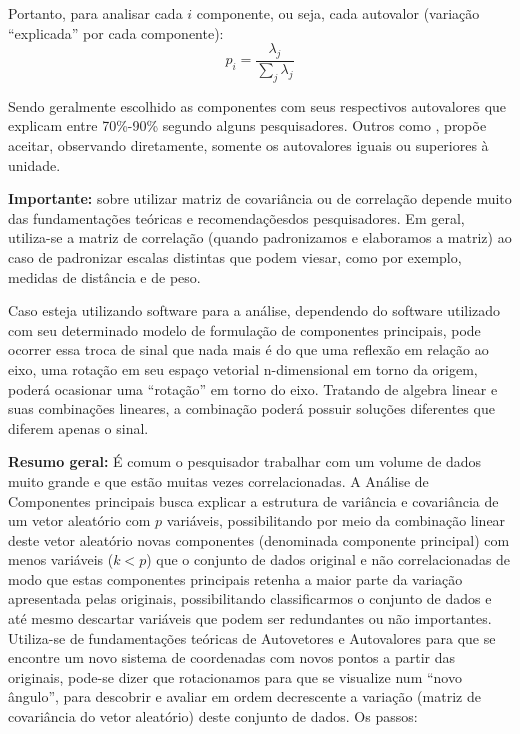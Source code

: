 \documentclass[
]{book}
\begin{document}
Portanto, para analisar cada \(i\) componente, ou seja, cada autovalor (variação ``explicada'' por cada componente):
\begin{equation}
    p_i=\frac{\lambda_j}{\displaystyle \sum_j \lambda_j} 
    \label{eq:varind}
\end{equation}

Sendo geralmente escolhido as componentes com seus respectivos autovalores que explicam entre 70\%-90\% segundo alguns pesquisadores. Outros como \citet{kaiser1960application}, propõe aceitar, observando diretamente, somente os autovalores iguais ou superiores à unidade.

\textbf{Importante:} sobre utilizar matriz de covariância ou de correlação depende muito das fundamentações teóricas e recomendaçõesdos pesquisadores. Em geral, utiliza-se a matriz de correlação (quando padronizamos e elaboramos a matriz) ao caso de padronizar escalas distintas que podem viesar, como por exemplo, medidas de distância e de peso.

Caso esteja utilizando software para a análise, dependendo do software utilizado com seu determinado modelo de formulação de componentes principais, pode ocorrer essa troca de sinal que nada mais é do que uma reflexão em relação ao eixo, uma rotação em seu espaço vetorial n-dimensional em torno da origem, poderá ocasionar uma ``rotação'' em torno do eixo. Tratando de algebra linear e suas combinações lineares, a combinação poderá possuir soluções diferentes que diferem apenas o sinal.

\textbf{Resumo geral:} É comum o pesquisador trabalhar com um volume de dados muito grande e que estão muitas vezes correlacionadas. A Análise de Componentes principais busca explicar a estrutura de variância e covariância de um vetor aleatório com \(p\) variáveis, possibilitando por meio da combinação linear deste vetor aleatório novas componentes (denominada componente principal) com menos variáveis (\(k<p\)) que o conjunto de dados original e não correlacionadas de modo que estas componentes principais retenha a maior parte da variação apresentada pelas originais, possibilitando classificarmos o conjunto de dados e até mesmo descartar variáveis que podem ser redundantes ou não importantes. Utiliza-se de fundamentações teóricas de Autovetores e Autovalores para que se encontre um novo sistema de coordenadas com novos pontos a partir das originais, pode-se dizer que rotacionamos para que se visualize num ``novo ângulo'', para descobrir e avaliar em ordem decrescente a variação (matriz de covariância do vetor aleatório) deste conjunto de dados. Os passos:
\end{document}
